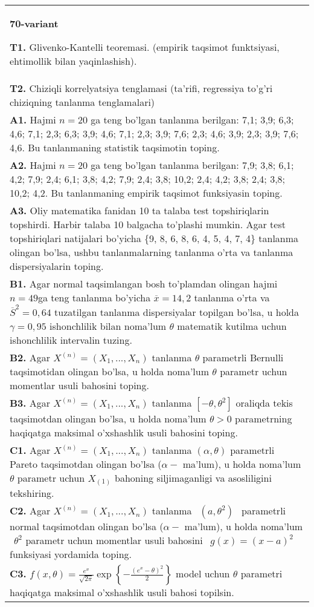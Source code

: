 \documentclass{article}
\begin{document}
\begin{tabular}{m{17cm}}
\textbf{70-variant}
\newline

\textbf{T1.} 
Glivenko-Kantelli teoremasi. (empirik taqsimot funktsiyasi, ehtimollik bilan yaqinlashish).
\\
\textbf{T2.} 
Chiziqli korrelyatsiya tenglamasi (ta'rifi, regressiya to'g'ri chiziqning tanlanma tenglamalari)
\\
\textbf{A1.} 
Hajmi \(n = 20\) ga teng bo'lgan tanlanma berilgan: 7,1; 3,9; 6,3; 4,6; 7,1; 2,3; 6,3; 3,9; 4,6; 7,1; 2,3; 3,9; 7,6; 2,3; 4,6; 3,9; 2,3; 3,9; 7,6; 4,6. Bu tanlanmaning statistik taqsimotin toping.
\\
\textbf{A2.} 
Hajmi \(n = 20\) ga teng bo'lgan tanlanma berilgan: 7,9; 3,8; 6,1; 4,2; 7,9; 2,4; 6,1; 3,8; 4,2; 7,9; 2,4; 3,8; 10,2; 2,4; 4,2; 3,8; 2,4; 3,8; 10,2; 4,2. Bu tanlanmaning empirik taqsimot funksiyasin toping.
\\
\textbf{A3.} 
Oliy matematika fanidan 10 ta talaba test topshiriqlarin topshirdi. Harbir talaba 10 balgacha to'plashi mumkin. Agar test topshiriqlari natijalari bo'yicha \{9, 8, 6, 8, 6, 4, 5, 4, 7, 4\} tanlanma olingan bo'lsa, ushbu tanlanmalarning tanlanma o'rta va tanlanma dispersiyalarin toping.
\\
\textbf{B1.} 
Agar normal taqsimlangan bosh to'plamdan olingan hajmi \(n = 49\)ga teng tanlanma bo'yicha \(\overline{x} = 14,2\) tanlanma o'rta va \({\overline{S}}^{2} = 0,64\) tuzatilgan tanlanma dispersiyalar topilgan bo'lsa, u holda \(\gamma = 0,95\) ishonchlilik bilan noma'lum \(\theta\) matematik kutilma uchun ishonchlilik intervalin tuzing.
\\
\textbf{B2.} 
Agar \(X^{(n)} = \left( X_{1},...,X_{n} \right)\) tanlanma \(\theta\) parametrli Bernulli taqsimotidan olingan bo'lsa, u holda noma'lum \(\theta\) parametr uchun momentlar usuli bahosini toping.
\\
\textbf{B3.} 
Agar \(X^{(n)} = \left( X_{1},...,X_{n} \right)\) tanlanma \(\left\lbrack - \theta,\theta^{2} \right\rbrack\) oraliqda tekis taqsimotdan olingan bo'lsa, u holda noma'lum \(\theta > 0\) parametrning haqiqatga maksimal o'xshashlik usuli bahosini toping.
\\
\textbf{C1.} 
Agar \(X^{(n)} = \left( X_{1},...,X_{n} \right)\) tanlanma \((\alpha,\theta)\) parametrli Pareto taqsimotdan olingan bo'lsa (\(\alpha -\) ma'lum), u holda noma'lum \(\theta\) parametr uchun \(X_{(1)}\) bahoning siljimaganligi va asosliligini tekshiring.
\\
\textbf{C2.} 
Agar \(X^{(n)} = \left( X_{1},...,X_{n} \right)\) tanlanma \(\ \ (a,\theta^{2})\ \ \) parametrli normal taqsimotdan olingan bo'lsa (\(\alpha -\) ma'lum), u holda noma'lum \(\ \ \theta^{2}\) parametr uchun momentlar usuli bahosini \(\ \ g(x) = (x - a)^{2}\) funksiyasi yordamida toping.
\\
\textbf{C3.} 
\(f(x,\theta) = \frac{e^{x}}{\sqrt{2\pi}}\exp\left\{ - \frac{\left( e^{x} - \theta \right)^{2}}{2} \right\}\) model uchun \(\theta\) parametri haqiqatga maksimal o'xshashlik usuli bahosi topilsin.
\\

\end{tabular}
\vspace{1cm}
\end{document}
